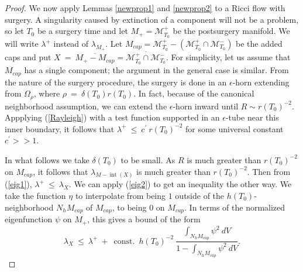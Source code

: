 \documentclass[12pt]{amsart}
\newcommand{\const}{\operatorname{const.}}
\newcommand{\Int}{\operatorname{int}}
\newcommand{\M}{{\mathcal M}}
\numberwithin{equation}{section}
\theoremstyle{plain}
\theoremstyle{definition}
\theoremstyle{remark}
\begin{document}
\begin{proof}
We now apply Lemmas \ref{newprop1} and \ref{newprop2} 
to a Ricci flow with surgery.
A singularity caused by extinction of a component will not be a
problem, so
let $T_0$ be a surgery time  and let
$M_+ = \M_{T_0}^+$ be the postsurgery manifold.  We will write
$\lambda^+$ instead of $\lambda_{M_+}$. Let $M_{cap} = 
\M_{T_0}^+ - (\M_{T_0}^+ \cap \M_{T_0}^-)$ be the added
caps and put $X \: = \: \overline{M_+ - M_{cap}} = 
\overline{\M_{T_0}^+ \cap \M_{T_0}^-}$.
For simplicity,
let us assume that $M_{cap}$ has a single component; the argument in
the general case is similar.
From the nature of the surgery procedure, the surgery is done in an
$\epsilon$-horn extending from $\Omega_\rho$, where
$\rho \: = \: \delta(T_0) r(T_0)$. 
In fact, because of the canonical
neighborhood assumption, we can extend the $\epsilon$-horn inward
until $R \sim r(T_0)^{-2}$. Appplying (\ref{Rayleigh}) with a test function
supported in an $\epsilon$-tube near this inner boundary, it follows that
$\lambda^+ \: \le \: c^\prime \: r(T_0)^{-2}$ for some universal constant 
$c^\prime >> 1$. 


In what follows we take $\delta(T_0)$ to be small.
As $R$ is much greater than $r(T_0)^{-2}$ on $M_{cap}$, it follows that
$\lambda_{M - \Int(X)}$ is much greater than $r(T_0)^{-2}$. Then from
(\ref{eig1}), $\lambda^+ \: \le \: \lambda_X$. We can apply
(\ref{eig2}) to get an inequality the other way.
We take the function $\eta$ to interpolate from being $1$ outside of the
$h(T_0)$-neighborhood 
$N_h M_{cap}$ of $M_{cap}$, to being $0$ on $M_{cap}$. 
In terms of the normalized eigenfunction $\psi$ on $M_+$, 
this gives a bound of the form
\begin{equation} \label{bound11}
\lambda_X \: \le \: \lambda^+ \: + \: \const \: h(T_0)^{-2} \:
\frac{\int_{N_h M_{cap}} \psi^2 \: dV}{1 - \int_{N_h M_{cap}} \psi^2 \: dV}.
\end{equation}


\end{proof}
\end{document}
